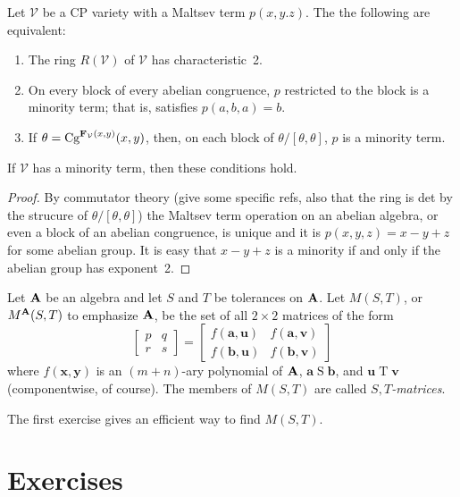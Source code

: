 \begin{lemma}
Let $\mathcal V$ be a CP variety with a Maltsev term $p(x,y.z)$.
The the following are equivalent:
\begin{enumerate}
\item
The ring $R(\mathcal V)$ of $\mathcal V$ has characteristic~2.
\item
On every block of every abelian congruence, $p$ restricted to the 
block is a minority term; that is, satisfies $p(a,b,a) = b$.
\item
If $\theta = \textup{Cg}^{\mathbf{F}_{\mathcal V}(x,y)}(x,y)$, then,
on each block of $\theta/[\theta,\theta]$, $p$ is a minority term.
\end{enumerate}
If $\mathcal V$ has a minority term, then these conditions hold.
\end{lemma}

\begin{proof}
By commutator theory (give some specific refs, also that the ring
is det by the strucure of $\theta/[\theta,\theta]$) 
the Maltsev term operation on an
abelian algebra, or even a block of an abelian congruence, 
is unique and it is $p(x,y,z) = x - y + z$ for
some abelian group. It is easy that $x - y + z$ is a minority
if and only if the abelian group has exponent~2.
\end{proof}





Let $\mathbf{A}$ be an algebra and let $S$ and $T$ be tolerances
on $\mathbf{A}$. 
Let $M(S,T)$, or $M^{\mathbf{A}}(S,T)$ to emphasize $\mathbf{A}$,
be the set of all $2 \times 2$ matrices of the form
\begin{equation}\label{eq1}
\begin{bmatrix}
p&q\\
r&s
\end{bmatrix}
=
\begin{bmatrix}
f(\mathbf{a},\mathbf{u})&f(\mathbf{a},\mathbf{v})\\
f(\mathbf{b},\mathbf{u})&f(\mathbf{b},\mathbf{v})
\end{bmatrix}
\end{equation}
where $f(\mathbf{x},\mathbf{y})$ is an $(m+n)$-ary polynomial of
$\mathbf{A}$, $\mathbf{a} \mathrel{S} \mathbf{b}$, and 
$\mathbf{u} \mathrel{T} \mathbf{v}$
(componentwise, of course). The members of $M(S,T)$ are called
\emph{$S,T$-matrices}.

The first exercise gives an efficient way to find $M(S,T)$.

\section*{Exercises}

